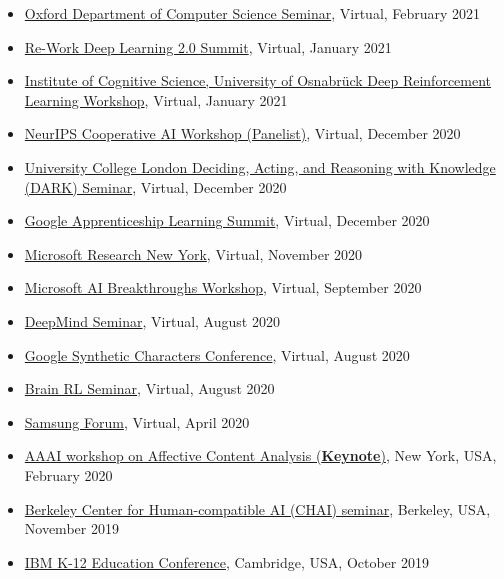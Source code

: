 \documentclass[paper=letter,fontsize=11pt]{scrartcl} %
\newcommand{\TalkEntry}[4]{
        \noindent \href{#4}{#1}, #2, #3 }
\begin{document}
\begin{itemize}
\item\TalkEntry{Oxford Department of Computer Science Seminar}{Virtual}{February 2021}{http://www.cs.ox.ac.uk/seminars/2371.html}
\item\TalkEntry{Re-Work Deep Learning 2.0 Summit}{Virtual}{January 2021}{https://www.re-work.co/events/reinforcement-learning-summit}%
\item\TalkEntry{Institute of Cognitive Science, University of Osnabrück Deep Reinforcement Learning Workshop}{Virtual}{January 2021}{https://www.youtube.com/watch?list=PLlVUF9l2EowbdI05VOaMp73p-TtZjQW7A&v=G__GZKNhvsU&feature=emb_logo}
\item\TalkEntry{NeurIPS Cooperative AI Workshop (Panelist)}{Virtual}{December 2020}{https://www.cooperativeai.com/neurips-2020/speakers}
\item\TalkEntry{University College London Deciding, Acting, and Reasoning with Knowledge (DARK) Seminar}{Virtual}{December 2020}{https://www.youtube.com/watch?v=traKBhJm4lQ&feature=youtu.be}
\item\TalkEntry{Google Apprenticeship Learning Summit}{Virtual}{December 2020}{https://sites.google.com/corp/google.com/alsummit2020}
\item\TalkEntry{Microsoft Research New York}{Virtual}{November 2020}{}
\item\TalkEntry{Microsoft AI Breakthroughs Workshop}{Virtual}{September 2020}{https://www.microsoft.com/en-us/research/event/ai-breakthroughs-2020/#!agenda}
\item\TalkEntry{DeepMind Seminar}{Virtual}{August 2020}{}
\item\TalkEntry{Google Synthetic Characters Conference}{Virtual}{August 2020}{https://sites.google.com/corp/google.com/sc2020/schedule-agenda?authuser=0} 
\item\TalkEntry{Brain RL Seminar}{Virtual}{August 2020}{} 
\item\TalkEntry{Samsung Forum}{Virtual}{April 2020}{https://www.samsung.com/us/ssic/session/towards-social-and-affective-machine-learning/} 
\item\TalkEntry{AAAI workshop on Affective Content Analysis (\textbf{Keynote})}{New York, USA}{February 2020}{https://sites.google.com/corp/view/affcon2020/invited-speakers} 
\item\TalkEntry{Berkeley Center for Human-compatible AI (CHAI) seminar}{Berkeley, USA}{November 2019}{} 
\item\TalkEntry{IBM K-12 Education Conference}{Cambridge, USA}{October 2019}{} 

\end{itemize}
\end{document}
